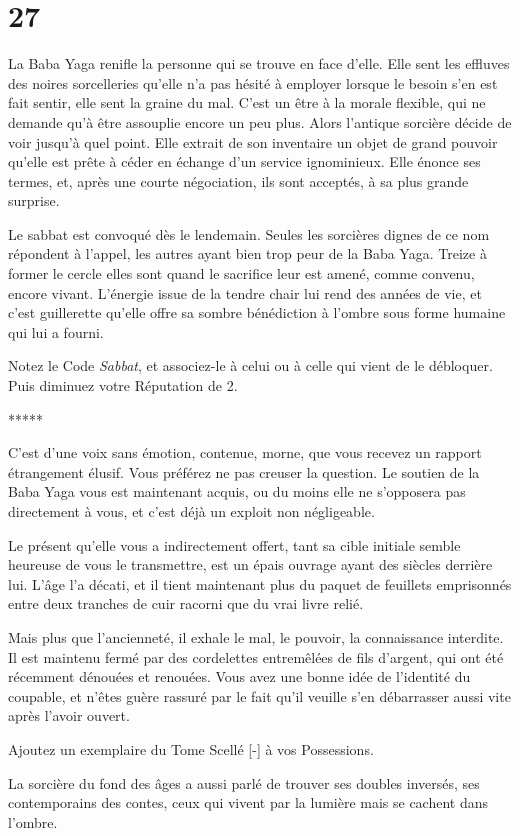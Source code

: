 \documentclass{report}
\newcommand{\gsection}[1]{
    \section{#1}
    \label{section-#1}
}
\newcommand{\ellipse}{
    \begin{center}
        *****
    \end{center}
}
\begin{document}
\gsection{27}

La Baba Yaga renifle la personne qui se trouve en face d'elle. Elle sent les effluves des noires sorcelleries qu'elle n'a pas hésité à employer lorsque le besoin s'en est fait sentir, elle sent la graine du mal. C'est un être à la morale flexible, qui ne demande qu'à être assouplie encore un peu plus. Alors l'antique sorcière décide de voir jusqu'à quel point. Elle extrait de son inventaire un objet de grand pouvoir qu'elle est prête à céder en échange d'un service ignominieux. Elle énonce ses termes, et, après une courte négociation, ils sont acceptés, à sa plus grande surprise.

Le sabbat est convoqué dès le lendemain. Seules les sorcières dignes de ce nom répondent à l'appel, les autres ayant bien trop peur de la Baba Yaga. Treize à former le cercle elles sont quand le sacrifice leur est amené, comme convenu, encore vivant. L'énergie issue de la tendre chair lui rend des années de vie, et c'est guillerette qu'elle offre sa sombre bénédiction à l'ombre sous forme humaine qui lui a fourni.

Notez le Code \emph{Sabbat}, et associez-le à celui ou à celle qui vient de le débloquer. Puis diminuez votre Réputation de 2.

\ellipse

C'est d'une voix sans émotion, contenue, morne, que vous recevez un rapport étrangement élusif. Vous préférez ne pas creuser la question. Le soutien de la Baba Yaga vous est maintenant acquis, ou du moins elle ne s'opposera pas directement à vous, et c'est déjà un exploit non négligeable.

Le présent qu'elle vous a indirectement offert, tant sa cible initiale semble heureuse de vous le transmettre, est un épais ouvrage ayant des siècles derrière lui. L'âge l'a décati, et il tient maintenant plus du paquet de feuillets emprisonnés entre deux tranches de cuir racorni que du vrai livre relié.

Mais plus que l'ancienneté, il exhale le mal, le pouvoir, la connaissance interdite. Il est maintenu fermé par des cordelettes entremêlées de fils d'argent, qui ont été récemment dénouées et renouées. Vous avez une bonne idée de l'identité du coupable, et n'êtes guère rassuré par le fait qu'il veuille s'en débarrasser aussi vite après l'avoir ouvert.

Ajoutez un exemplaire du Tome Scellé [-] à vos Possessions.

La sorcière du fond des âges a aussi parlé de trouver ses doubles inversés, ses contemporains des contes, ceux qui vivent par la lumière mais se cachent dans l'ombre.
\end{document}
